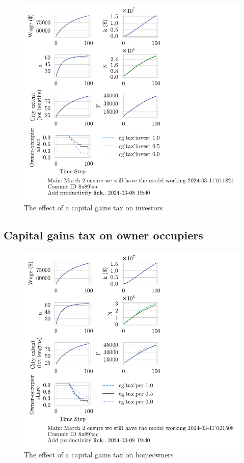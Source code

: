 \begin{figure}[b!]
    \centering
    \includegraphics[scale=1.2, trim={0 1.4cm 4cm 0},clip]{fig/cg_tax_invest-Main-011821.pdf}
    \caption{The effect of a capital gains tax on investors}
    \label{fig:CGinvest_ownership_trajectory}
\end{figure}

\newpage

\subsection{Capital gains tax on owner occupiers}

\begin{figure}[b!]
    \centering
    \includegraphics[scale=1.2, trim={0 1.4cm 0 0},clip]{fig/cg_tax_per-Main-021508.pdf}
    \caption{The effect of a capital gains tax on homeowners}
    \label{fig:CGpers_ownership_trajectory}
\end{figure}

